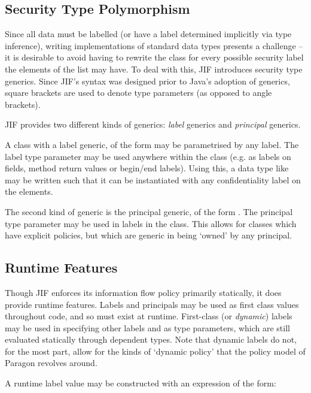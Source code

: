 \subsection{Security Type Polymorphism}

Since all data must be labelled (or have a label determined implicitly via type inference), writing implementations of standard data types presents a challenge -- it is desirable to avoid having to rewrite the  class for every possible security label the elements of the list may have. To deal with this, JIF introduces security type generics. Since JIF's syntax was designed prior to Java's adoption of generics, square brackets are used to denote type parameters (as opposed to angle brackets).

JIF provides two different kinds of generics: \textit{label} generics and \textit{principal} generics.

A class with a label generic, of the form  may be parametrised by any label. The label type parameter may be used anywhere within the class (e.g. as labels on fields, method return values or begin/end labels). Using this, a data type like  may be written such that it can be instantiated with any confidentiality label on the elements.

The second kind of generic is the principal generic, of the form . The principal type parameter may be used in labels in the class. This allows for classes which have explicit policies, but which are generic in being `owned' by any principal.

\subsection{Runtime Features}

Though JIF enforces its information flow policy primarily statically, it does provide runtime features. Labels and principals may be used as first class values throughout code, and so must exist at runtime. First-class (or \textit{dynamic}) labels may be used in specifying other labels and as type parameters, which are still evaluated statically through dependent types. Note that dynamic labels do not, for the most part, allow for the kinds of `dynamic policy' that the policy model of Paragon revolves around.

A runtime label value may be constructed with an expression of the form:


